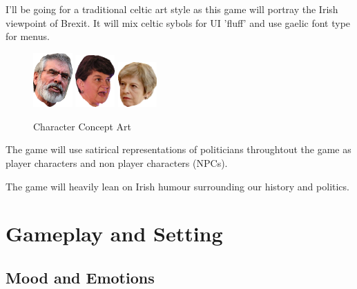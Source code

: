 \documentclass[a4paper]{scrreprt}
\begin{document}
    \begin{flushleft}
        I'll be going for a traditional celtic art style as this game will portray the Irish viewpoint of Brexit. 
        It will mix celtic sybols for UI 'fluff' and use gaelic font type for menus.
    \end{flushleft}

    \begin{figure}[H]
        \begin{addmargin}[13.5em]{0em}
            \includegraphics[width=1.5cm]{gerry-right}
            \includegraphics[width=1.5cm]{arlene}
            \includegraphics[width=1.5cm]{tess}
        \end{addmargin}
        \caption{\label{fig:art} Character Concept Art}
    \end{figure}

    \begin{flushleft}
    The game will use satirical representations of politicians throughtout the game as player characters and non player characters (NPCs).
    \end{flushleft}

    \begin{flushleft}
        The game will heavily lean on Irish humour surrounding our history and politics.
    \end{flushleft}

    \chapter{Gameplay and Setting}

    \section{Mood and Emotions}
\end{document}
